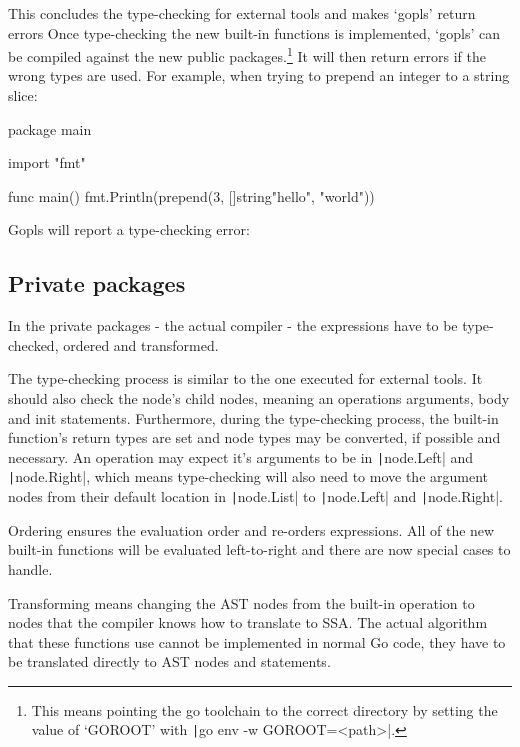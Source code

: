 This concludes the type-checking for external tools and makes `gopls' return errors
Once type-checking the new built-in functions is implemented, `gopls' can be
compiled against the new public packages.\footnote{
This means pointing the go toolchain to the correct directory by setting
the value of `GOROOT' with \texttt|go env -w GOROOT=<path>|.
}
It will then return errors if the wrong types are used. For example, when trying
to prepend an integer to a string slice:

\begin{gocode}
package main

import "fmt"

func main() {
    fmt.Println(prepend(3, []string{"hello", "world"}))
}
\end{gocode}

Gopls will report a type-checking error:

\subsection{Private packages}

In the private packages - the actual compiler - the expressions have to be
type-checked, ordered and transformed.

The type-checking process is similar to the one executed for external tools.
It should also check the node's child nodes, meaning an operations
arguments, body and init statements. Furthermore, during the type-checking
process, the built-in function's return types are set and node types
may be converted, if possible and necessary.
An operation may expect it's arguments to be in \texttt|node.Left|
and \texttt|node.Right|, which means type-checking will also need
to move the argument nodes from their default location in
\texttt|node.List| to \texttt|node.Left| and
\texttt|node.Right|.

Ordering ensures the evaluation order and re-orders expressions. All of
the new built-in functions will be evaluated left-to-right and there are now
special cases to handle.

Transforming means changing the AST nodes from the built-in operation to
nodes that the compiler knows how to translate to SSA. The actual algorithm
that these functions use cannot be implemented in normal Go code, they have to be
translated directly to AST nodes and statements.

